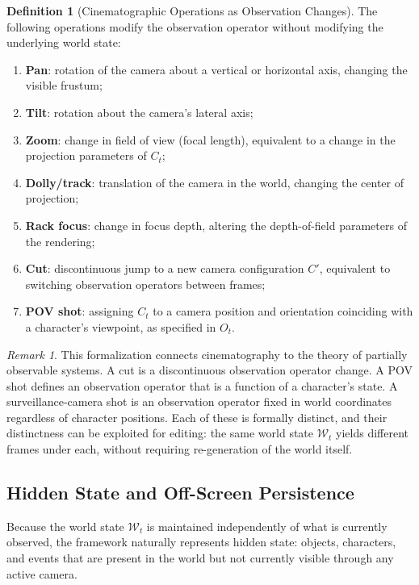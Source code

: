 \documentclass[12pt,a4paper]{article}
\theoremstyle{plain}
\theoremstyle{definition}
\newtheorem{definition}[theorem]{Definition}
\theoremstyle{remark}
\newtheorem{remark}[theorem]{Remark}
\begin{document}
\begin{definition}[Cinematographic Operations as Observation Changes]
The following operations modify the observation operator without modifying the underlying world state:
\begin{enumerate}[leftmargin=2em,itemsep=0pt]
\item \textbf{Pan}: rotation of the camera about a vertical or horizontal axis, changing the visible frustum;
\item \textbf{Tilt}: rotation about the camera's lateral axis;
\item \textbf{Zoom}: change in field of view (focal length), equivalent to a change in the projection parameters of $C_t$;
\item \textbf{Dolly/track}: translation of the camera in the world, changing the center of projection;
\item \textbf{Rack focus}: change in focus depth, altering the depth-of-field parameters of the rendering;
\item \textbf{Cut}: discontinuous jump to a new camera configuration $C'$, equivalent to switching observation operators between frames;
\item \textbf{POV shot}: assigning $C_t$ to a camera position and orientation coinciding with a character's viewpoint, as specified in $O_t$.
\end{enumerate}
\end{definition}

\begin{remark}
This formalization connects cinematography to the theory of partially observable systems. A cut is a discontinuous observation operator change. A POV shot defines an observation operator that is a function of a character's state. A surveillance-camera shot is an observation operator fixed in world coordinates regardless of character positions. Each of these is formally distinct, and their distinctness can be exploited for editing: the same world state $\mathcal{W}_t$ yields different frames under each, without requiring re-generation of the world itself.
\end{remark}

\subsection{Hidden State and Off-Screen Persistence}

Because the world state $\mathcal{W}_t$ is maintained independently of what is currently observed, the framework naturally represents hidden state: objects, characters, and events that are present in the world but not currently visible through any active camera.
\end{document}
